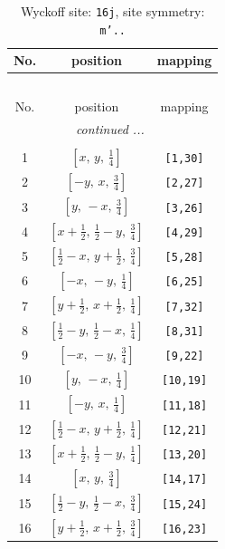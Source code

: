 \documentclass[fleqn,8pt]{jsarticle}
\begin{document}
\renewcommand{\arraystretch}{1.2}
\begin{longtable}{ccc}
\caption{Wyckoff site: {\tt 16j}, site symmetry: {\tt m'..}}
 \\
 \hline \hline
No. & position & mapping \\ \hline \endfirsthead

\multicolumn{2}{l}{\tablename\ \thetable{}} \\
 \hline \hline
No. & position & mapping \\ \hline \endhead

 \hline \hline
\multicolumn{2}{r}{\footnotesize\it continued ...} \\ \endfoot

 \hline \hline
\multicolumn{2}{r}{} \\ \endlastfoot

1 & $\left[ x,\, y,\, \frac{1}{4} \right]$ & {\tt [1,30]} \\ \hline
2 & $\left[ - y,\, x,\, \frac{3}{4} \right]$ & {\tt [2,27]} \\ \hline
3 & $\left[ y,\, - x,\, \frac{3}{4} \right]$ & {\tt [3,26]} \\ \hline
4 & $\left[ x + \frac{1}{2},\, \frac{1}{2} - y,\, \frac{3}{4} \right]$ & {\tt [4,29]} \\ \hline
5 & $\left[ \frac{1}{2} - x,\, y + \frac{1}{2},\, \frac{3}{4} \right]$ & {\tt [5,28]} \\ \hline
6 & $\left[ - x,\, - y,\, \frac{1}{4} \right]$ & {\tt [6,25]} \\ \hline
7 & $\left[ y + \frac{1}{2},\, x + \frac{1}{2},\, \frac{1}{4} \right]$ & {\tt [7,32]} \\ \hline
8 & $\left[ \frac{1}{2} - y,\, \frac{1}{2} - x,\, \frac{1}{4} \right]$ & {\tt [8,31]} \\ \hline
9 & $\left[ - x,\, - y,\, \frac{3}{4} \right]$ & {\tt [9,22]} \\ \hline
10 & $\left[ y,\, - x,\, \frac{1}{4} \right]$ & {\tt [10,19]} \\ \hline
11 & $\left[ - y,\, x,\, \frac{1}{4} \right]$ & {\tt [11,18]} \\ \hline
12 & $\left[ \frac{1}{2} - x,\, y + \frac{1}{2},\, \frac{1}{4} \right]$ & {\tt [12,21]} \\ \hline
13 & $\left[ x + \frac{1}{2},\, \frac{1}{2} - y,\, \frac{1}{4} \right]$ & {\tt [13,20]} \\ \hline
14 & $\left[ x,\, y,\, \frac{3}{4} \right]$ & {\tt [14,17]} \\ \hline
15 & $\left[ \frac{1}{2} - y,\, \frac{1}{2} - x,\, \frac{3}{4} \right]$ & {\tt [15,24]} \\ \hline
16 & $\left[ y + \frac{1}{2},\, x + \frac{1}{2},\, \frac{3}{4} \right]$ & {\tt [16,23]} \\
\end{longtable}
\end{document}
